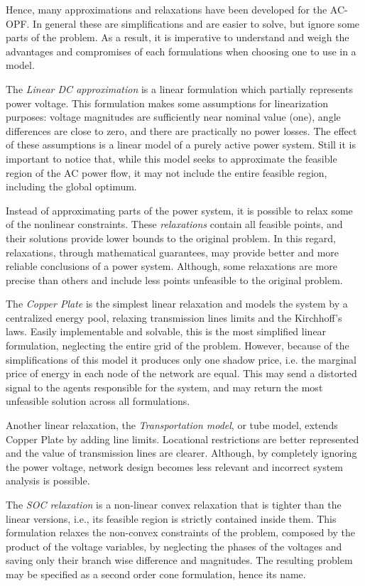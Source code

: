 \documentclass{juliacon}
\begin{document}
Hence, many approximations and relaxations have been developed for the AC-OPF. In general these are simplifications and are easier to solve, but ignore some parts of the problem. As a result, it is imperative to understand and weigh the advantages and compromises of each formulations when choosing one to use in a model.

The \textit{Linear DC approximation} is a linear formulation which partially represents power voltage. This formulation makes some assumptions for linearization purposes: voltage magnitudes are sufficiently near nominal value (one), angle differences are close to zero, and there are practically no power losses. The effect of these assumptions is a linear model of a purely active power system. Still it is important to notice that, while this model seeks to approximate the feasible region of the AC power flow, it may not include the entire feasible region, including the global optimum. 

Instead of approximating parts of the power system, it is possible to relax some of the nonlinear constraints. These \textit{relaxations} contain all feasible points, and their solutions provide lower bounds to the original problem. In this regard, relaxations, through mathematical guarantees, may provide better and more reliable conclusions of a power system. Although, some relaxations are more precise than others and include less points unfeasible to the original problem.

The \textit{Copper Plate} is the simplest linear relaxation and models the system by a centralized energy pool, relaxing transmission lines limits and the Kirchhoff’s laws. Easily implementable and solvable, this is the most simplified linear formulation, neglecting the entire grid of the problem. However, because of the simplifications of this model it produces only one shadow price, i.e. the marginal price of energy in each node of the network are equal. This may send a distorted signal to the agents responsible for the system, and may return the most unfeasible solution across all formulations.

Another linear relaxation, the \textit{Transportation model}, or tube model, extends Copper Plate by adding line limits. Locational restrictions are better represented and the value of transmission lines are clearer. Although, by completely ignoring the power voltage, network design becomes less relevant and incorrect system analysis is possible.

The \textit{SOC relaxation} is a non-linear convex relaxation that is tighter than the linear versions, i.e., its feasible region is strictly contained inside them. This formulation relaxes the non-convex constraints of the problem, composed by the product of the voltage variables, by neglecting the phases of the voltages and saving only their branch wise difference and magnitudes. The resulting problem may be specified as a second order cone formulation, hence its name.
\end{document}
